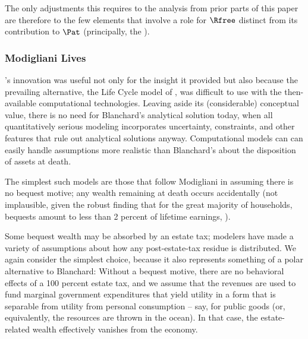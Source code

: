 \documentclass[BufferStockTheory]{subfiles}
\begin{document}
The only adjustments this requires to the analysis from prior parts of this paper are therefore to the few elements that involve a role for $\Rfree$ distinct from its contribution to $\Pat$ (principally, the {\RIC}).  %


\hypertarget{Modigliani-Lives}{}
\subsubsection{Modigliani Lives}

\cite{blanchardFinite}'s innovation was useful not only for the insight it provided but also because the prevailing alternative, the Life Cycle model of \cite{modiglianiWealth}, was difficult to use with the then-available computational technologies.  Leaving aside its (considerable) conceptual value, there is no need for Blanchard's analytical solution today, when all quantitatively serious modeling incorporates uncertainty, constraints, and other features that rule out analytical solutions anyway.  Computational models can can easily handle assumptions more realistic than Blanchard's about the disposition of assets at death.

The simplest such models are those that follow Modigliani in assuming there is no bequest motive; any wealth remaining at death occurs accidentally (not implausible, given the robust finding that for the great majority of households, bequests amount to less than 2 percent of lifetime earnings, \cite{hendricksBequests,hendricksSmallBequests}).

Some bequest wealth may be absorbed by an estate tax; modelers have made a variety of assumptions about how any post-estate-tax residue is distributed.  We again consider the simplest choice, because it also represents something of a polar alternative to Blanchard: Without a bequest motive, there are no behavioral effects of a 100 percent estate tax, and we assume that the revenues are used to fund marginal government expenditures that yield utility in a form that is separable from utility from personal consumption -- say, for public goods (or, equivalently, the resources are thrown in the ocean).  In that case, the estate-related wealth effectively vanishes from the economy.
\end{document}

